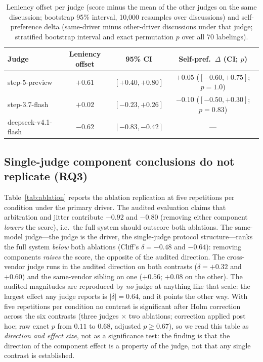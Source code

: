\begin{table}[t]
\centering
\caption{Leniency offset per judge (score minus the mean of the other
judges on the same discussion; bootstrap 95\% interval, 10{,}000
resamples over discussions) and self-preference delta (same-driver
minus other-driver discussions under that judge; stratified bootstrap
interval and exact permutation $p$ over all 70 labelings).}
\label{tab:leniency}
\small
\begin{tabular}{@{}lccc@{}}
\toprule
Judge & Leniency offset & 95\% CI & Self-pref.\ $\Delta$ (CI; $p$) \\
\midrule
step-5-preview & $+0.61$ & $[+0.40,+0.80]$ & $+0.05$ ($[-0.60,+0.75]$; $p=1.0$) \\
step-3.7-flash & $+0.02$ & $[-0.23,+0.26]$ & $-0.10$ ($[-0.50,+0.30]$; $p=0.83$) \\
deepseek-v4.1-flash & $-0.62$ & $[-0.83,-0.42]$ & --- \\
\bottomrule
\end{tabular}
\end{table}

\subsection{Single-judge component conclusions do not replicate (RQ3)}

Table~\ref{tab:ablation} reports the ablation replication at five
repetitions per condition under the primary driver. The audited
evaluation claims that arbitration and jitter contribute $-0.92$ and
$-0.80$ (removing either component \emph{lowers} the score), i.e.\ the
full system should outscore both ablations. The same-model judge---the
judge is the driver, the single-judge protocol structure---ranks the
full system \emph{below} both ablations (Cliff's $\delta=-0.48$ and
$-0.64$): removing components \emph{raises} the score, the opposite of
the audited direction. The cross-vendor judge runs in the audited
direction on both contrasts ($\delta=+0.32$ and $+0.60$) and the
same-vendor sibling on one ($+0.56$; $+0.08$ on the other). The audited
magnitudes are reproduced by \emph{no} judge at anything like that
scale: the largest effect any judge reports is $\lvert\delta\rvert=0.64$,
and it points the other way. With five repetitions per condition no
contrast is significant after Holm correction across the six contrasts
(three judges $\times$ two ablations; correction applied post hoc; raw
exact $p$ from $0.11$ to $0.68$, adjusted $p\geq0.67$), so we read this
table as \emph{direction and effect size}, not as a significance test: the finding is that the direction of the
component effect is a property of the judge, not that any single
contrast is established.

